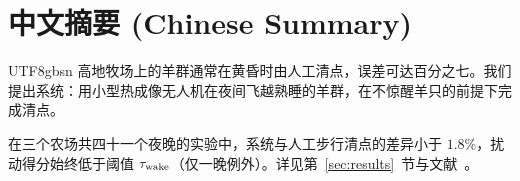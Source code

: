 \section{中文摘要 (Chinese Summary)}
\label{sec:cjk}
\begin{CJK}{UTF8}{gbsn}
高地牧场上的羊群通常在黄昏时由人工清点，误差可达百分之七。我们提出\sys{}系统：用小型热成像无人机在夜间飞越熟睡的羊群，在不惊醒羊只的前提下完成清点。

在三个农场共四十一个夜晚的实验中，系统与人工步行清点的差异小于 $1.8\%$，扰动得分始终低于阈值 $\tau_{\mathrm{wake}}$（仅一晚例外）。详见第~\ref{sec:results}~节与文献~\citep{oyelaran2019flock}。
\end{CJK}
